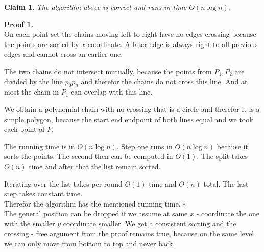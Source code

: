 \documentclass[11pt,a4paper,ngerman]{article}
\newtheorem{lemma}{\bfseries Claim}
\begin{document}
\begin{lemma}\label{alge:ueb5:simp:cor}
    The algorithm above is correct and runs in time $O(n \log n)$.
\end{lemma}

\textbf{Proof \ref{alge:ueb5:simp:cor}.}\\

On each point set the chains moving left to right have no edges crossing because the points
are sorted by $x$-coordinate. A later edge is always right to all previous edges and cannot cross 
an earlier one.

The two chains do not intersect mutually, because the points from $P_1, P_2$ are divided by
the line $\overline{p_0p_n}$ and therefor the chains do not cross this line. And at most the chain in $P_1$ can 
overlap with this line.

We obtain a polynomial chain with no crossing that is a circle and therefor it is a simple polygon, because
the start end endpoint of both lines equal and we took each point of $P$.

The running time is in $O(n \log n)$.
Step one runs in $O(n \log n)$ because it sorts the points. The second then can be computed in $O(1)$.
The split takes $O(n)$ time and after that the list remain sorted.

Iterating over the list takes per round $O(1)$ time and $O(n)$ total. The last step takes constant time.\\

Therefor the algorithm has the mentioned running time.
\mbox{} \hfill $\square$\\

The general position can be dropped if we assume at same $x$ - coordinate the one with the smaller $y$ coordinate smaller.
We get a consistent sorting and the crossing - free argument from the proof remains true, because on the same level we can only
move from bottom to top and never back.

\label{LastPage}
\end{document}
